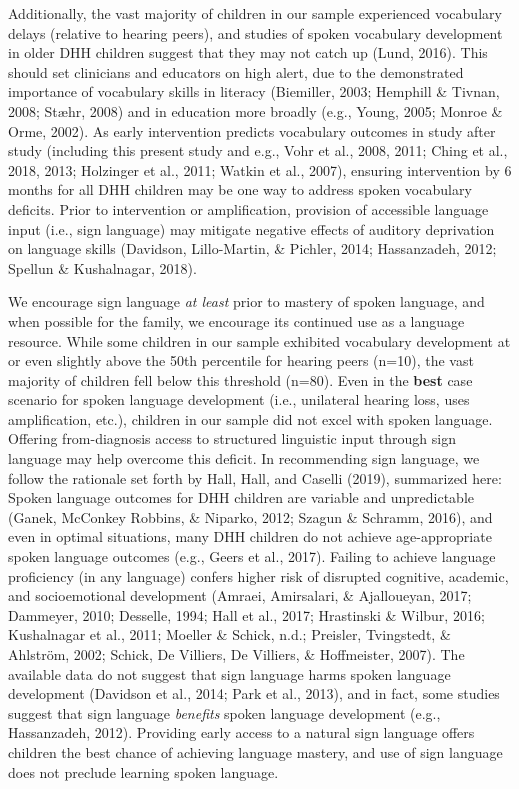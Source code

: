 \documentclass[english,man]{apa6}
\begin{document}
Additionally, the vast majority of children in our sample experienced vocabulary delays (relative to hearing peers), and studies of spoken vocabulary development in older DHH children suggest that they may not catch up (Lund, 2016). This should set clinicians and educators on high alert, due to the demonstrated importance of vocabulary skills in literacy (Biemiller, 2003; Hemphill \& Tivnan, 2008; Stæhr, 2008) and in education more broadly (e.g., Young, 2005; Monroe \& Orme, 2002). As early intervention predicts vocabulary outcomes in study after study (including this present study and e.g., Vohr et al., 2008, 2011; Ching et al., 2018, 2013; Holzinger et al., 2011; Watkin et al., 2007), ensuring intervention by 6 months for all DHH children may be one way to address spoken vocabulary deficits. Prior to intervention or amplification, provision of accessible language input (i.e., sign language) may mitigate negative effects of auditory deprivation on language skills (Davidson, Lillo-Martin, \& Pichler, 2014; Hassanzadeh, 2012; Spellun \& Kushalnagar, 2018).

We encourage sign language \emph{at least} prior to mastery of spoken language, and when possible for the family, we encourage its continued use as a language resource. While some children in our sample exhibited vocabulary development at or even slightly above the 50th percentile for hearing peers (n=10), the vast majority of children fell below this threshold (n=80). Even in the \textbf{best} case scenario for spoken language development (i.e., unilateral hearing loss, uses amplification, etc.), children in our sample did not excel with spoken language. Offering from-diagnosis access to structured linguistic input through sign language may help overcome this deficit. In recommending sign language, we follow the rationale set forth by Hall, Hall, and Caselli (2019), summarized here: Spoken language outcomes for DHH children are variable and unpredictable (Ganek, McConkey Robbins, \& Niparko, 2012; Szagun \& Schramm, 2016), and even in optimal situations, many DHH children do not achieve age-appropriate spoken language outcomes (e.g., Geers et al., 2017). Failing to achieve language proficiency (in any language) confers higher risk of disrupted cognitive, academic, and socioemotional development (Amraei, Amirsalari, \& Ajalloueyan, 2017; Dammeyer, 2010; Desselle, 1994; Hall et al., 2017; Hrastinski \& Wilbur, 2016; Kushalnagar et al., 2011; Moeller \& Schick, n.d.; Preisler, Tvingstedt, \& Ahlström, 2002; Schick, De Villiers, De Villiers, \& Hoffmeister, 2007). The available data do not suggest that sign language harms spoken language development (Davidson et al., 2014; Park et al., 2013), and in fact, some studies suggest that sign language \emph{benefits} spoken language development (e.g., Hassanzadeh, 2012). Providing early access to a natural sign language offers children the best chance of achieving language mastery, and use of sign language does not preclude learning spoken language.
\end{document}

